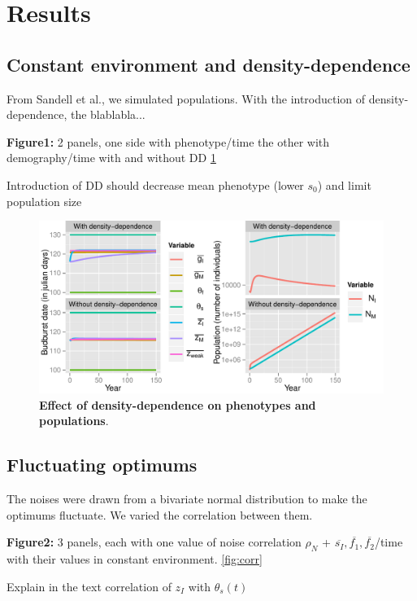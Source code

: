 \label{sec:Res}
\section*{Results}

\subsection*{Constant environment and density-dependence}

From Sandell et al., we simulated populations. With the introduction of density-dependence, the blablabla...

\textbf{Figure1:} 2 panels, one side with phenotype/time the other with demography/time with and without DD \ref{fig:dd}

Introduction of DD should decrease mean phenotype (lower $s_{0}$) and limit population size

\begin{figure}[ht!]
	\centering
	\label{fig:dd}
	\includegraphics[scale=1]{Figures/DDphenopop.pdf}
	\caption{\textbf{Effect of density-dependence on phenotypes and populations}.}
\end{figure}

\subsection*{Fluctuating optimums}

The noises were drawn from a bivariate normal distribution to make the optimums fluctuate. We varied the correlation between them.

\textbf{Figure2:} 3 panels, each with one value of noise correlation $\rho_{N}$ + $\overline{s_{I}}, \overline{f_{1}}, \overline{f_{2}}$/time with their values in constant environment.
\ref{fig:corr}

Explain in the text correlation of $z_{I}$ with $\theta_{s}(t)$

